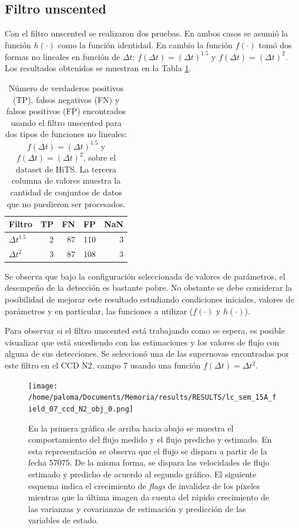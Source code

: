 \subsection{Filtro unscented}
Con el filtro unscented se realizaron dos pruebas. En ambos casos se asumi\'o la funci\'on $h(\cdot)$ como la funci\'on identidad. En cambio la funci\'on $f(\cdot)$ tom\'o dos formas no lineales en funci\'on de $\Delta t$: $f(\Delta t) = (\Delta t)^{1.5}$ y $f(\Delta t) = (\Delta t)^{2}$. Los resultados obtenidos se muestran en la Tabla \ref{tab:tpfn_ukf}.

\begin{table}[h!]
\centering
\caption{N\'umero de verdaderos positivos (TP), falsos negativos (FN) y falsos positivos (FP) encontrados usando el filtro unscented para dos tipos de funciones no lineales: $f(\Delta t) = (\Delta t)^{1.5}$ y $f(\Delta t) = (\Delta t)^{2}$, sobre el dataset de HiTS. La tercera columna de valores muestra la cantidad de conjuntos de datos que no puedieron ser procesados.}
\begin{tabular}{|l|r|r|r|r|}
\hline
\textbf{Filtro} & \textbf{TP} & \textbf{FN} & \textbf{FP} & \textbf{NaN}\\ \hline
$\Delta t^{1.5}$          & 2          & 87          & 110 &  3 \\ \hline
$\Delta t^{2}$             & 3          & 87          & 108  & 3 \\ \hline
\end{tabular}
\label{tab:tpfn_ukf}
\end{table}
\bigskip

Se observa que bajo la configuraci\'on seleccionada de valores de par\'ametros, el desempe\~no de la detecci\'on es bastante pobre. No obstante se debe considerar la posibilidad de mejorar este resultado estudiando condiciones iniciales, valores de par\'ametros y en particular, las funciones a utilizar ($f(\cdot)$ y $h(\cdot)$).
\bigskip

Para observar si el filtro unscented est\'a trabajando como se espera, es posible visualizar que est\'a sucediendo con las estimaciones y los valores de flujo con alguna de sus detecciones. Se seleccion\'o una de las supernovas encontradas por este filtro en el CCD N2, campo 7 usando una funci\'on $f(\Delta t) = \Delta t^{2}$.

\begin{figure}
\centering
\texttt{[image: /home/paloma/Documents/Memoria/results/RESULTS/lc\_sem\_15A\_field\_07\_ccd\_N2\_obj\_0.png]}
\caption{En la primera gr\'afica de arriba hacia abajo se muestra el comportamiento del flujo medido y el flujo predicho y estimado. En esta representaci\'on se observa que el flujo se dispara a partir de la fecha 57075. De la misma forma, se dispara las velocidades de flujo estimado y predicho de acuerdo al segundo gr\'afico. El siguiente esquema indica el crecimiento de \textit{flags} de invalidez de los p\'ixeles  mientras que la \'ultima imagen da cuenta del r\'apido crecimiento de las varianzas y covarianzas de estimaci\'on y predicci\'on de las variables de estado. }
\label{ukf_rlc}
\end{figure}

